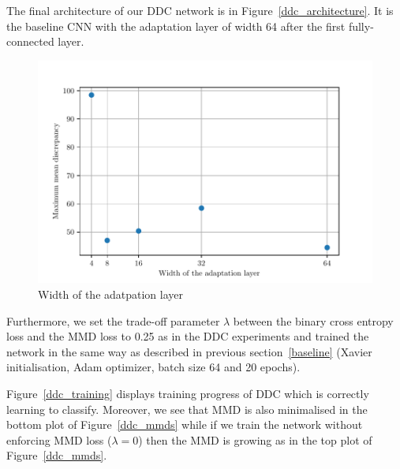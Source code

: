 The final architecture of our DDC network is in Figure~\ref{ddc_architecture}.
It is the baseline CNN with the adaptation layer of width 64
after the first fully-connected layer.

\begin{figure}
	\includegraphics[width=\textwidth]{img/adaptation_layer_width.pdf}
	\caption{Width of the adatpation layer}
	\label{adaptation_layer}
\end{figure}

Furthermore, we set the trade-off parameter \(\lambda\)
between the binary cross entropy loss
and the MMD loss to 0.25 as in the DDC experiments
and trained the network in the same way as described in previous section~\ref{baseline}
(Xavier initialisation, Adam optimizer, batch size 64 and 20 epochs).

Figure~\ref{ddc_training} displays training progress of DDC
which is correctly learning to classify.
Moreover, we see that MMD is also minimalised in the bottom plot of Figure~\ref{ddc_mmds}
while if we train the network without enforcing MMD loss (\(\lambda = 0\))
then the MMD is growing as in the top plot of Figure~\ref{ddc_mmds}.

